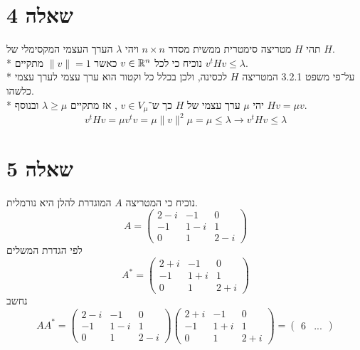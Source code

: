 \section{שאלה 4}
תהי $H$ מטריצה סימטרית ממשית מסדר $n \times n$ ויהי $\lambda$ הערך העצמי המקסימלי של $H$. \\*
נוכיח כי לכל $v \in \mathbb{R}^n$ כאשר $\lVert v \rVert = 1$ מתקיים $v^t H v \le \lambda$. \\*
על־פי משפט 3.2.1 המטריצה $H$ לכסינה, ולכן בכלל כל וקטור הוא ערך עצמי לערך עצמי כלשהו. \\*
יהי $\mu$ ערך עצמי של $H$ כך ש־$v \in V_\mu$ , אז מתקיים $\lambda \ge \mu$ ובנוסף $H v = \mu v$.
\[
	v^t H v = \mu v^t v = \mu \lVert v \rVert^2 \mu = \mu \le \lambda \rightarrow v^t H v \le \lambda
\]

\section{שאלה 5}
נוכיח כי המטריצה $A$ המוגדרת להלן היא נורמלית.
\[
	A = \begin{pmatrix}
		2 - i & -1 & 0 \\
		-1 & 1 - i & 1 \\
		0 & 1 & 2 - i
	\end{pmatrix}
\]
לפי הגדרת המשלים
\[
	A^* = \begin{pmatrix}
		2 + i & -1 & 0 \\
		-1 & 1 + i & 1 \\
		0 & 1 & 2 + i
	\end{pmatrix}
\]
נחשב
\[
	A A^* = 
	\begin{pmatrix}
		2 - i & -1 & 0 \\
		-1 & 1 - i & 1 \\
		0 & 1 & 2 - i
	\end{pmatrix}
	\begin{pmatrix}
		2 + i & -1 & 0 \\
		-1 & 1 + i & 1 \\
		0 & 1 & 2 + i
	\end{pmatrix}
	= \begin{pmatrix}
		6 & ...
	\end{pmatrix}
\]

